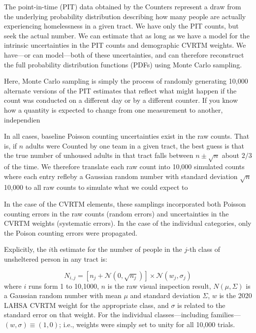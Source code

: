 \documentclass[11pt,twocolumn]{article}
\begin{document}
The point-in-time (PIT) data obtained by the Counters represent a draw from the underlying probability
distribution describing how many people are actually experiencing homelessness in a given tract. We have
only the PIT counts, but seek the actual number. We can estimate that as long as we have a model for
the intrinsic uncertainties in the PIT counts and demographic CVRTM weights. We have---or can 
model---both of these uncertainties, and can therefore reconstruct the full probability distribution 
functions (PDFs) using Monte Carlo sampling.

Here, Monte Carlo sampling is simply the process of randomly generating 10,000 alternate versions of
the PIT estimates that reflect what might happen if the count was conducted on a different day or by
a different counter. If you know how a quantity is expected to change from one measurement to another,
independien 

In all cases, baseline Poisson counting uncertainties exist in the raw counts. That is, if $n$ adults were 
Counted by one team in a given tract, the best guess is that the true number of unhoused adults 
in that tract falls between $n\pm\sqrt{n}$ about $2/3$ of the time. We therefore translate each raw 
count into 10,000 simulated counts where each entry refleby a Gaussian random number with standard deviation $\sqrt{n}$ 10,000
to all raw counts to simulate what we could expect to 

In the case of the CVRTM elements, these samplings incorporated both Poisson counting 
errors in the raw counts (random errors) and uncertainties in the CVRTM weights (systematic errors). 
In the case of the individual categories, only the Poison counting errors were propagated.

Explicitly, the $i$th estimate for the number of people in the $j$-th class of unsheltered person in any
tract is:

\begin{equation}\label{eq:monte}
	N_{i,j} = \left[n_{j} + \mathcal{N}(0,\sqrt{n_{j}})\right]\times\mathcal{N}(w_{j}, \sigma_{j})
\end{equation}
where $i$ runs form 1 to 10,1000, $n$ is the raw visual inspection result, $N(\mu,\Sigma)$ is a 
Gaussian random number with mean $\mu$ and standard deviation $\Sigma$, $w$ is the 2020 
LAHSA CVRTM weight for the appropriate class, and $\sigma$ is related to the standard error on that 
weight. For the individual classes---including families---$(w,\sigma)\equiv(1,0)$; i.e., weights were simply 
set to unity for all 10,000 trials.
\end{document}
